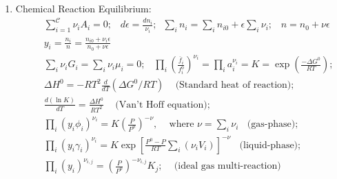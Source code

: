 \documentclass[12pts,a4paper,amsmath,amssymb,floatfix]{article}%
\newcommand{\frc}{\displaystyle\frac}
\newcommand{\summation}[3][error]{\sum\limits_{#2}^{#3}#1}
\begin{document}
\begin{enumerate}[1.]
\item Chemical Reaction Equilibrium:
  \begin{eqnarray}
    && \summation[\nu_{i}A_{i}]{i=1}{\mathcal{C}}=0;\;\;\;d\epsilon=\frc{dn_{i}}{\nu_{i}};\;\;\summation[n_{i}]{i}{} = \summation[n_{i0}]{i}{}+\epsilon\summation[\nu_{i}]{i}{};\;\;\; n = n_{0} +\nu\epsilon \nonumber \\
    &&  y_{i} = \frc{n_{i}}{n} = \frc{n_{i0}+\nu_{i}\epsilon}{n_{0}+\nu\epsilon} \nonumber \\
    && \summation[\nu_{i}G_{i}]{i}{} = \summation[\nu_{i}\mu_{i}]{i}{}=0;\;\;\; \prod\limits_{i}\left(\frc{\overline{f}_{i}}{f_{i}^{0}}\right)^{\nu_{i}} = \prod\limits_{i}a_{i}^{\nu_{i}} = K =\exp\left(\frc{-\Delta G^{0}}{RT}\right); \nonumber \\
    && \Delta H^{0} = -RT^{2}\frc{d}{dT}\left(\Delta G^{0}/RT\right)\;\;\;\text{ (Standard heat of reaction)};\nonumber \\
    && \frc{d\left(\ln{K}\right)}{dT} =\frc{\Delta H^{0}}{RT^{2}}\;\;\;\text{ (Van't Hoff equation)};\nonumber \\
    && \prod\limits_{i}\left(y_{i}\phi_{i}\right)^{\nu_{i}} =K \left(\frc{P}{P^{0}}\right)^{-\nu},\;\;\; \text{ where } \nu=\sum\limits_{i}\nu_{i}\;\;\text{ (gas-phase)}; \nonumber\\
    && \prod\limits_{i}\left(y_{i}\gamma_{i}\right)^{\nu_{i}} = K\exp\left[\frc{P^{0}-P}{RT}\sum\limits_{i}\left(\nu_{i}V_{i}\right)\right]^{-\nu}\;\;\text{ (liquid-phase)};\nonumber\\
    && \prod_{i}\left(y_{i}\right)^{\nu_{i,j}} = \left(\frc{P}{P^{0}}\right)^{-\nu_{i,j}}K_{j};\;\;\;\text{ (ideal gas multi-reaction)} \nonumber
  \end{eqnarray}
  
\end{enumerate}
\end{document}
